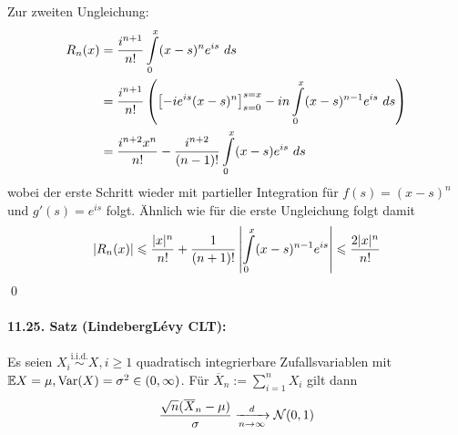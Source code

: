 \documentclass[11pt]{report}
\begin{document}
 Zur zweiten Ungleichung:\newline
 \begin{align*}
     R_n(x)&=\dfrac{i^{n+1}}{n!}\int\displaylimits_0^x(x-s)^ne^{is}\ ds\\
     &=\dfrac{i^{n+1}}{n!}\left(\left[-ie^{is}(x-s)^n\right]_{s=0}^{s=x}-in\int\displaylimits_0^x(x-s)^{n-1}e^{is}\ ds\right) \\
     &=\dfrac{i^{n+2}x^n}{n!}-\dfrac{i^{n+2}}{(n-1)!}\int\displaylimits_0^x(x-s)e^{is}\ ds
 \end{align*}
 wobei der erste Schritt wieder mit partieller Integration f\"ur $f(s)=(x-s)^n$ und $g'(s)=e^{is}$ folgt. \"Ahnlich wie f\"ur die erste Ungleichung folgt damit
 $$|R_n(x)|\leq\dfrac{|x|^n}{n!}+\dfrac{1}{(n+1)!}\left|\int\displaylimits_0^x(x-s)^{n-1}e^{is}\right|\leq\dfrac{2|x|^n}{n!}$$
 \qed
 
 \paragraph{11.25. Satz (Lindeberg\textendash L\'evy CLT):} Es seien $X_i\overset{\text{i.i.d.}}{\sim} X,i\geq1$ quadratisch integrierbare Zufallsvariablen mit $\E X=\mu,\operatorname{Var}(X)=\sigma^2\in(0,\infty)$. F\"ur $\overline X_n:=\sum_{i=1}^n X_i$ gilt dann
 $$\dfrac{\sqrt{n}(\overline X_n-\mu)}{\sigma}\nto{d}{n\to\infty}\mathcal{N}(0,1)$$
 
\end{document}
